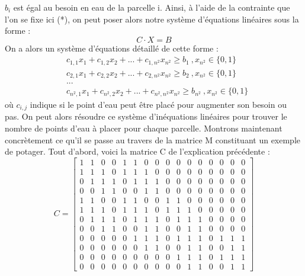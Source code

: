 \documentclass[french,a4paper]{article}
\begin{document}
\newline $b_i$ est égal au besoin en eau de la parcelle i.
\newline Ainsi, à l'aide de la contrainte que l'on se fixe ici (*), on peut poser alors notre système d'équations linéaires sous la forme :
\newline \begin{equation} C \cdot X = B \end{equation}
\newline
\newline On a alors un système d'équations détaillé de cette forme :
\newline
\begin{equation}
    \begin{aligned}
         & c_{1,1}x_1+c_{1,2}x_2+...+c_{1,n^2}x_{n^2} \ge b_1 \ , x_{n^2} \in \{0,1\}           \\
         & c_{2,1}x_1+c_{2,2}x_2+...+c_{2,n^2}x_{n^2} \ge b_2 \ , x_{n^2} \in \{0,1\}           \\
         & ...                                                                                  \\
         & c_{n^2,1}x_1+c_{n^2,2}x_2+...+c_{n^2,n^2}x_{n^2} \ge b_{n^2} \ , x_{n^2} \in \{0,1\}
    \end{aligned}
\end{equation}
\newline
\newline où $c_{i,j}$ indique si le point d'eau peut être placé pour augmenter son besoin ou pas.
\newline On peut alors résoudre ce système d'inéquations linéaires pour trouver le nombre de points d'eau à placer pour chaque parcelle.
\newline Montrons maintenant concrètement ce qu'il se passe au travers de la matrice M constituant un exemple de potager.
\newline Tout d'abord, voici la matrice C de l'explication précédente :
\[C = \begin{bmatrix} 
1 & 1 & 0 & 0 & 1 & 1 & 0 & 0 & 0 & 0 & 0 & 0 & 0 & 0 & 0 & 0 \\ 
1 & 1 & 1 & 0 & 1 & 1 & 1 & 0 & 0 & 0 & 0 & 0 & 0 & 0 & 0 & 0 \\ 
0 & 1 & 1 & 1 & 0 & 1 & 1 & 1 & 0 & 0 & 0 & 0 & 0 & 0 & 0 & 0 \\ 
0 & 0 & 1 & 1 & 0 & 0 & 1 & 1 & 0 & 0 & 0 & 0 & 0 & 0 & 0 & 0 \\ 
1 & 1 & 0 & 0 & 1 & 1 & 0 & 0 & 1 & 1 & 0 & 0 & 0 & 0 & 0 & 0 \\ 
1 & 1 & 1 & 0 & 1 & 1 & 1 & 0 & 1 & 1 & 1 & 0 & 0 & 0 & 0 & 0 \\ 
0 & 1 & 1 & 1 & 0 & 1 & 1 & 1 & 0 & 1 & 1 & 1 & 0 & 0 & 0 & 0 \\ 
0 & 0 & 1 & 1 & 0 & 0 & 1 & 1 & 0 & 0 & 1 & 1 & 0 & 0 & 0 & 0 \\ 
0 & 0 & 0 & 0 & 0 & 1 & 1 & 1 & 0 & 1 & 1 & 1 & 0 & 1 & 1 & 1 \\ 
0 & 0 & 0 & 0 & 0 & 0 & 1 & 1 & 0 & 0 & 1 & 1 & 0 & 0 & 1 & 1 \\ 
0 & 0 & 0 & 0 & 0 & 0 & 0 & 0 & 0 & 1 & 1 & 1 & 0 & 1 & 1 & 1 \\ 
0 & 0 & 0 & 0 & 0 & 0 & 0 & 0 & 0 & 0 & 1 & 1 & 0 & 0 & 1 & 1
\end{bmatrix}\]
\end{document}
